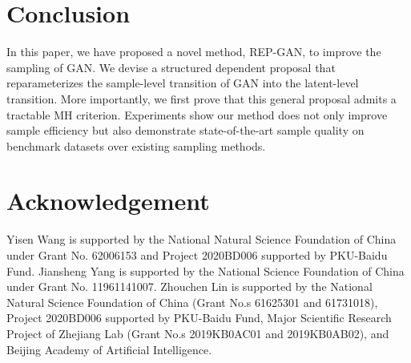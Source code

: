 \documentclass[runningheads]{llncs}
\newcommand{\<}{\left\langle}
\renewcommand{\>}{\right\rangle}
\begin{document}
\section{Conclusion}
In this paper, we have proposed a novel method, REP-GAN, to improve the sampling of GAN. We devise a structured dependent proposal that reparameterizes the sample-level transition of GAN into the latent-level transition. More importantly, we first prove that this general proposal admits a tractable MH criterion. 
Experiments show our method does not only improve sample efficiency but also demonstrate state-of-the-art sample quality on benchmark datasets over existing sampling methods.


\section*{Acknowledgement}
Yisen Wang is supported by the National Natural Science Foundation of China under Grant No. 62006153 and Project
2020BD006 supported by PKU-Baidu Fund. Jiansheng Yang is supported by the National Science Foundation of
China under Grant No. 11961141007. Zhouchen
Lin is supported by the National Natural Science Foundation of China (Grant No.s 61625301 and 61731018), Project 2020BD006 supported by PKU-Baidu Fund, Major Scientific Research Project of Zhejiang Lab (Grant No.s
2019KB0AC01 and 2019KB0AB02), and Beijing Academy
of Artificial Intelligence. 
\end{document}
